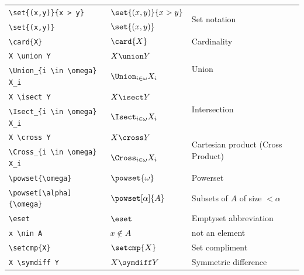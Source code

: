 \documentclass[leqno,11pt]{amsart}
\begin{document}
\begin{tabular}{l |  l | l}\toprule
	\verb=\set{(x,y)}{x > y}=	  &    \(   \set{(x,y)}{x > y} \)    & \multirow{2}{*}{Set notation}  \\[6pt]
	\verb=\set{(x,y)}=			  & 	\(   \set{(x,y)}      \)    &  \\ \midrule
	\verb=\card{X}=                          &    \(   \card{X}                   \)    & Cardinality \\ \midrule
	\verb=X \union Y=                        &    \(   X \union Y                 \)    & \multirow{2}{*}{Union}  \\[6pt]
	\verb=\Union_{i \in \omega} X_i=         &    \(   \Union_{i \in \omega} X_i  \)    &  \\ \midrule
	\verb=X \isect Y=                        &    \(   X \isect Y                 \)    & \multirow{2}{*}{Intersection} \\[6pt]
	\verb=\Isect_{i \in \omega} X_i=         &    \(   \Isect_{i \in \omega} X_i  \)    &  \\ \midrule
	\verb=X \cross Y=                        &    \(   X \cross Y                 \)    & \multirow{2}{*}{Cartesian product (Cross Product)} \\[6pt]
	\verb=\Cross_{i \in \omega} X_i=         &    \(   \Cross_{i \in \omega} X_i  \)    &  \\ \midrule
	\verb=\powset{\omega}=                   &    \(   \powset{\omega}            \)    &   Powerset \\  \midrule
	\verb=\powset[\alpha]{\omega}= 			 &    \(   \powset[\alpha]{A}    \)    & Subsets of \( A \) of  size \( < \alpha \)  \\
	\verb=\eset=                             &    \(   \eset                      \)    &  Emptyset abbreviation\\ \midrule
	\verb=x \nin A=                          &    \(   x \nin A                   \)    &  not an element\\ \midrule
	\verb=\setcmp{X}=                        &    \(   \setcmp{X}                 \)    &  Set compliment\\\midrule
	\verb=X \symdiff Y=                      &    \(   X \symdiff Y               \)    & Symmetric difference \\ \bottomrule
		\bottomrule
	\end{tabular}          \\
\end{document}
